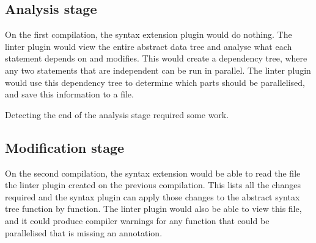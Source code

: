 \documentclass[conference]{IEEEtran}
\begin{document}
\subsection{Analysis stage}
On the first compilation, the syntax extension plugin would do nothing. The linter plugin would view the entire abstract data tree and analyse what each statement depends on and modifies. This would create a dependency tree, where any two statements that are independent can be run in parallel. The linter plugin would use this dependency tree to determine which parts should be parallelised, and save this information to a file.

Detecting the end of the analysis stage required some work.

\subsection{Modification stage}
On the second compilation, the syntax extension would be able to read the file the linter plugin created on the previous compilation. This lists all the changes required and the syntax plugin can apply those changes to the abstract syntax tree function by function. The linter plugin would also be able to view this file, and it could produce compiler warnings for any function that could be parallelised that is missing an annotation.

\printbibliography
\end{document}
